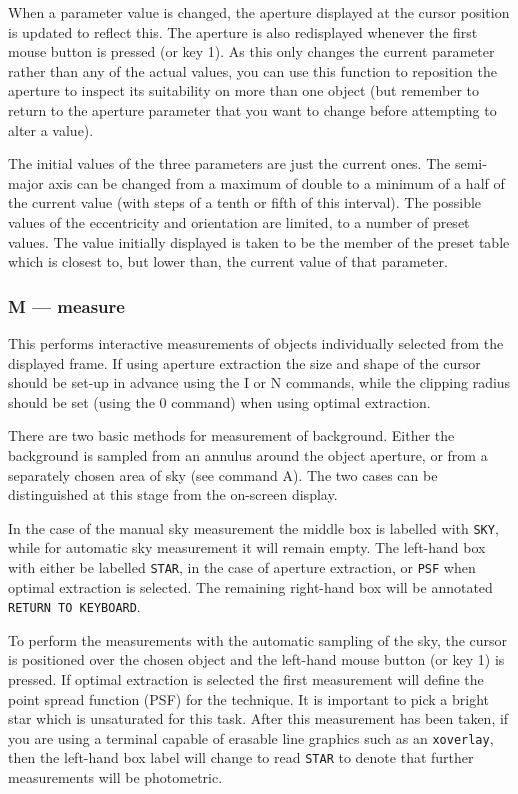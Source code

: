 \documentclass[twoside,11pt,nolof]{starlink}
\begin{document}
When a parameter value is changed, the aperture displayed at the
cursor position is updated to reflect this. The aperture is also
redisplayed whenever the first mouse button is pressed (or key 1).
As this only changes the current parameter rather than any of the
actual values, you can use this function to reposition the aperture to
inspect its suitability on more than one object (but remember to
return to the aperture parameter that you want to change before
attempting to alter a value).

The initial values of the three parameters are just the current ones.
The semi-major axis can be changed from a maximum of double to a
minimum of a half of the current value (with steps of a tenth or fifth
of this interval).  The possible values of the eccentricity and
orientation are limited, to a number of preset values. The value
initially displayed is taken to be the member of the preset table
which is closest to, but lower than, the current value of that
parameter.

\subsubsection{M --- measure}

This performs interactive measurements of objects individually selected
from the displayed frame. If using aperture extraction the size and shape
of the cursor should be set-up in advance using the I or N commands, while
the clipping radius should be set (using the 0 command) when using optimal
extraction.

There are two basic methods for measurement of background. Either the
background is sampled from an annulus around the object aperture, or
from a separately chosen area of sky (see command A). The two cases can be
distinguished at this stage from the on-screen display.

In the case of the manual sky measurement the middle box is
labelled with \texttt{SKY}, while for automatic sky measurement it
will remain empty. The left-hand box with either be labelled \texttt{STAR},
in the case of  aperture extraction, or \texttt{PSF} when optimal extraction is
selected. The remaining right-hand box will be annotated \texttt{RETURN~TO~KEYBOARD}.

To perform the measurements with the automatic sampling of the sky,
the cursor is positioned over the chosen object and the left-hand
mouse button (or key 1) is pressed. If optimal extraction is selected
the first measurement will define the point spread function (PSF) for
the technique. It is important to pick a bright star which is unsaturated
for this task. After this measurement has been taken, if you are using a terminal capable of erasable line graphics such as an \texttt{xoverlay},
then the left-hand box  label will change to read \texttt{STAR} to denote that
further measurements will be photometric.
\end{document}
